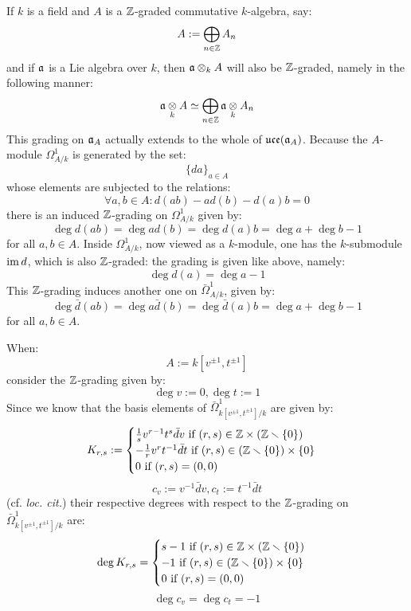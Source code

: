        \begin{remark} \label{remark: Z_gradings_on_toroidal_lie_algebras}
            If $k$ is a field and $A$ is a $\mathbb{Z}$-graded commutative $k$-algebra, say:
                $$A := \bigoplus_{n \in \mathbb{Z}} A_n$$
            and if $\mathfrak{a}$ is a Lie algebra over $k$, then $\a \tensor_k A$ will also be $\mathbb{Z}$-graded, namely in the following manner:
                $$\a \tensor_k A \cong \bigoplus_{n \in \Z} \a \tensor_k A_n$$
            This grading on $\mathfrak{a}_A$ actually extends to the whole of $\mathfrak{uce}(\mathfrak{a}_A)$. Because the $A$-module $\Omega^1_{A/k}$ is generated by the set:
                $$\{da\}_{a \in A}$$
            whose elements are subjected to the relations:
                $$\forall a, b \in A: d(ab) - a d(b) - d(a) b = 0$$
           there is an induced $\mathbb{Z}$-grading on $\Omega^1_{A/k}$ given by:
                $$\deg d(ab) = \deg a d(b) = \deg d(a) b = \deg a + \deg b - 1$$
            for all $a, b \in A$. Inside $\Omega^1_{A/k}$, now viewed as a $k$-module, one has the $k$-submodule $\operatorname{im} d$, which is also $\mathbb{Z}$-graded: the grading is given like above, namely:
                $$\deg d(a) = \deg a - 1$$
            This $\mathbb{Z}$-grading induces another one on $\bar{\Omega}^1_{A/k}$, given by:
                $$\deg \bar{d}(ab) = \deg a \bar{d}(b) = \deg \bar{d}(a) b = \deg a + \deg b - 1$$
            for all $a, b \in A$.

            When:
                $$A := k[v^{\pm 1}, t^{\pm 1}]$$
            consider the $\mathbb{Z}$-grading given by:
                $$\deg v := 0, \deg t := 1$$
            Since we know that the basis elements of $\bar{\Omega}^1_{k[v^{\pm 1}, t^{\pm 1}]/k}$ are given by:
                $$
                    K_{r, s} :=
                    \begin{cases}
                        \text{$\frac1s v^{r - 1} t^s \bar{d}v$ if $(r, s) \in \Z \x (\Z \setminus \{0\})$}
                        \\
                        \text{$-\frac1r v^r t^{-1} \bar{d}t$ if $(r, s) \in (\Z \setminus \{0\}) \x \{0\}$}
                        \\
                        \text{$0$ if $(r, s) = (0, 0)$}
                    \end{cases}
                $$
                $$c_v := v^{-1} \bar{d}v, c_t := t^{-1} \bar{d}t$$
            (cf. \textit{loc. cit.}) their respective degrees with respect to the $\mathbb{Z}$-grading on $\bar{\Omega}^1_{k[v^{\pm 1}, t^{\pm 1}]/k}$ are:
                $$
                    \deg K_{r, s} =
                    \begin{cases}
                        \text{$s - 1$ if $(r, s) \in \Z \x (\Z \setminus \{0\})$}
                        \\
                        \text{$-1$ if $(r, s) \in (\Z \setminus \{0\}) \x \{0\}$}
                        \\
                        \text{$0$ if $(r, s) = (0, 0)$}
                    \end{cases}
                $$
                $$\deg c_v = \deg c_t = -1$$
        \end{remark}

